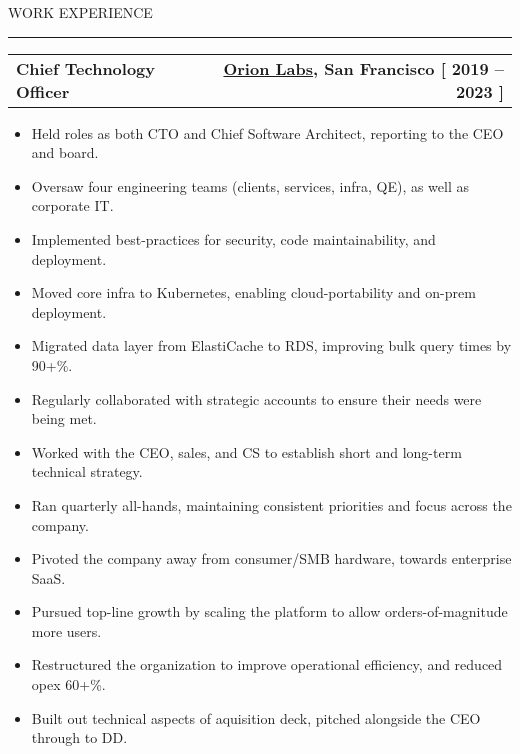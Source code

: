 \documentclass[12pt]{article}
\makeatletter
\newenvironment{justifycolumns}
{\begin{tabular*}{\textwidth}{@{\extracolsep{\fill}} lr@{}}}
{\end{tabular*}}
\newcommand{\row}[2]{#1 & #2 \\}
\newcommand{\rowheading}[2]{\row{\textbf{#1}}{\textbf{#2}}}
\newcommand{\range}[2]{#1 -- #2}
\newcommand{\blockseparation}{\vspace{0.13in}}
\newcommand{\heading}[1]{
	\vspace{0.05in}
	\uppercase{#1}
	\vspace{0.05in}
	\hrule
	\blockseparation
}
\newenvironment{tightbullets}
{\begin{itemize}}
{\end{itemize}}
\newenvironment{bullets}
{\begin{tightbullets}}
{\end{tightbullets} \blockseparation}
\makeatother
\begin{document}
\begin{flushleft}
\pagebreak

\heading{Work Experience}
\vspace{0.05in}

\hspace{0.2in}
\begin{justifycolumns}
	\hspace{0.1in}
	\rowheading{Chief Technology Officer}{\textnormal{\href{https://orionlabs.io}{Orion Labs}, San Francisco [ \range{2019}{2023} ]}}
\end{justifycolumns}
\begin{bullets}
	\item Held roles as both CTO and Chief Software Architect, reporting to the CEO and board.
	\item Oversaw four engineering teams (clients, services, infra, QE), as well as corporate IT.
	\item Implemented best-practices for security, code maintainability, and deployment.
	\item Moved core infra to Kubernetes, enabling cloud-portability and on-prem deployment.
	\item Migrated data layer from ElastiCache to RDS, improving bulk query times by 90+\%.
	\item Regularly collaborated with strategic accounts to ensure their needs were being met.
	\item Worked with the CEO, sales, and CS to establish short and long-term technical strategy.
	\item Ran quarterly all-hands, maintaining consistent priorities and focus across the company.
	\item Pivoted the company away from consumer/SMB hardware, towards enterprise SaaS.
	\item Pursued top-line growth by scaling the platform to allow orders-of-magnitude more users.
	\item Restructured the organization to improve operational efficiency, and reduced opex 60+\%.
	\item Built out technical aspects of aquisition deck, pitched alongside the CEO through to DD.
\end{bullets}
\vspace{0.05in}


\end{flushleft}
\end{document}
